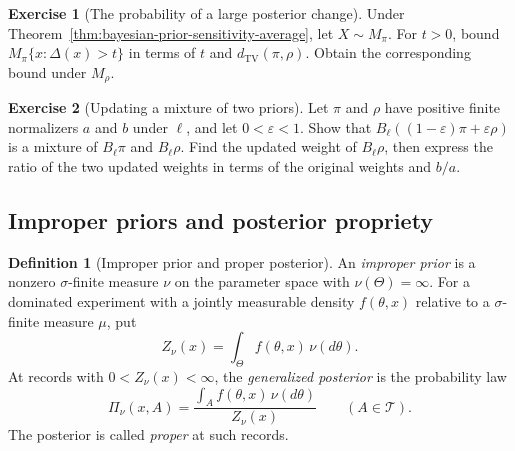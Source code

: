 \documentclass[11pt,oneside]{book}
\theoremstyle{definition}
\newtheorem{definition}[theorem]{Definition}
\newtheorem{exercise}{Exercise}[section]
\theoremstyle{remark}
\begin{document}
\begin{exercise}[The probability of a large posterior change]
\label{exer:bayesian-sensitivity-probability-large}
Under Theorem~\ref{thm:bayesian-prior-sensitivity-average}, let
$X\sim M_\pi$. For $t>0$, bound $M_\pi\{x:\Delta(x)>t\}$ in terms
of $t$ and $d_{\mathrm{TV}}(\pi,\rho)$. Obtain the corresponding
bound under $M_\rho$.
\end{exercise}

\begin{exercise}[Updating a mixture of two priors]
\label{exer:bayesian-sensitivity-mixture-odds}
Let $\pi$ and $\rho$ have positive finite normalizers $a$ and
$b$ under $\ell$, and let $0<\varepsilon<1$.
Show that $B_\ell((1-\varepsilon)\pi+\varepsilon\rho)$ is a
mixture of $B_\ell\pi$ and $B_\ell\rho$. Find the updated
weight of $B_\ell\rho$, then express the ratio of the two
updated weights in terms of the original weights and $b/a$.
\end{exercise}

\subsection{Improper priors and posterior propriety}
\label{subsec:bayesian-improper-priors}

\begin{definition}[Improper prior and proper posterior]
\label{def:bayesian-improper-prior}
An \emph{improper prior} is a nonzero $\sigma$-finite measure
$\nu$ on the parameter space with $\nu(\Theta)=\infty$.
For a dominated experiment with a jointly measurable density
$f(\theta,x)$ relative to a $\sigma$-finite measure $\mu$,
put
\[
Z_\nu(x)=\int_\Theta f(\theta,x)\,\nu(d\theta).
\]
At records with $0<Z_\nu(x)<\infty$, the \emph{generalized
posterior} is the probability law
\begin{equation}
\Pi_\nu(x,A)=\frac{\int_A f(\theta,x)\,\nu(d\theta)}{Z_\nu(x)}
\qquad(A\in\mathcal T).
\label{eq:bayesian-improper-posterior}
\end{equation}
The posterior is called \emph{proper} at such records.
\end{definition}
\end{document}
